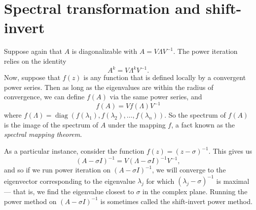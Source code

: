\section{Spectral transformation and shift-invert}

Suppose again that $A$ is diagonalizable with $A = V \Lambda V^{-1}$.
The power iteration relies on the identity
\[
  A^k = V \Lambda^k V^{-1}.
\]
Now, suppose that $f(z)$ is any function that is defined locally by a
convergent power series.  Then as long as the eigenvalues are within
the radius of convergence, we can define $f(A)$ via the same power series,
and
\[
  f(A) = V f(\Lambda) V^{-1}
\]
where $f(\Lambda) = \operatorname{diag}(f(\lambda_1), f(\lambda_2),
\ldots, f(\lambda_n))$.  So the spectrum of $f(A)$ is the image of
the spectrum of $A$ under the mapping $f$, a fact known as the
{\em spectral mapping theorem}.

As a particular instance, consider the function $f(z) = (z-\sigma)^{-1}$.
This gives us
\[
  (A-\sigma I)^{-1} = V (\Lambda - \sigma I)^{-1} V^{-1},
\]
and so if we run power iteration on $(A-\sigma I)^{-1}$, we will converge
to the eigenvector corresponding to the eigenvalue $\lambda_j$ for
which $(\lambda_j-\sigma)^{-1}$ is maximal --- that is, we find the eigenvalue
closest to $\sigma$ in the complex plane.  Running the power method on
$(A-\sigma I)^{-1}$ is sometimes called the shift-invert power method.
